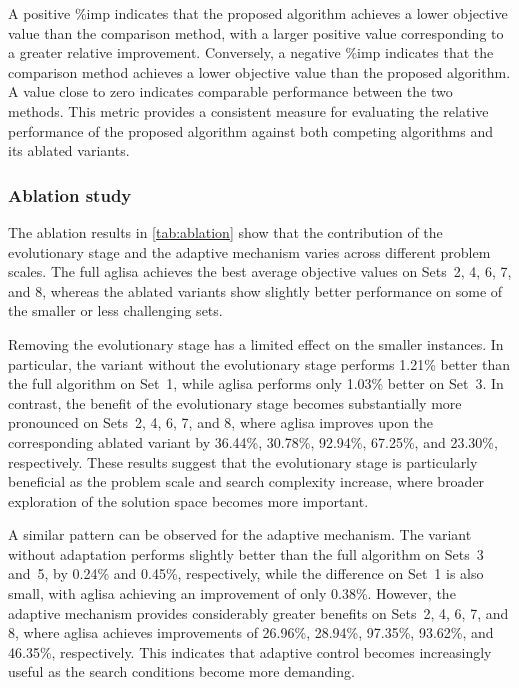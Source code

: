 \documentclass[pdflatex]{sn-jnl}
\begin{document}
A positive \%imp indicates that the proposed algorithm achieves a lower objective value than the comparison method, with a larger positive value corresponding to a greater relative improvement. Conversely, a negative \%imp indicates that the comparison method achieves a lower objective value than the proposed algorithm. A value close to zero indicates comparable performance between the two methods. This metric provides a consistent measure for evaluating the relative performance of the proposed algorithm against both competing algorithms and its ablated variants.

\subsubsection{Ablation study}
The ablation results in \autoref{tab:ablation} show that the contribution of the evolutionary stage and the adaptive mechanism varies across different problem scales. The full \gls{aglisa} achieves the best average objective values on Sets~2, 4, 6, 7, and 8, whereas the ablated variants show slightly better performance on some of the smaller or less challenging sets.

Removing the evolutionary stage has a limited effect on the smaller instances. In particular, the variant without the evolutionary stage performs 1.21\% better than the full algorithm on Set~1, while \gls{aglisa} performs only 1.03\% better on Set~3. In contrast, the benefit of the evolutionary stage becomes substantially more pronounced on Sets~2, 4, 6, 7, and 8, where \gls{aglisa} improves upon the corresponding ablated variant by 36.44\%, 30.78\%, 92.94\%, 67.25\%, and 23.30\%, respectively. These results suggest that the evolutionary stage is particularly beneficial as the problem scale and search complexity increase, where broader exploration of the solution space becomes more important.

A similar pattern can be observed for the adaptive mechanism. The variant without adaptation performs slightly better than the full algorithm on Sets~3 and~5, by 0.24\% and 0.45\%, respectively, while the difference on Set~1 is also small, with \gls{aglisa} achieving an improvement of only 0.38\%. However, the adaptive mechanism provides considerably greater benefits on Sets~2, 4, 6, 7, and 8, where \gls{aglisa} achieves improvements of 26.96\%, 28.94\%, 97.35\%, 93.62\%, and 46.35\%, respectively. This indicates that adaptive control becomes increasingly useful as the search conditions become more demanding.
\end{document}
